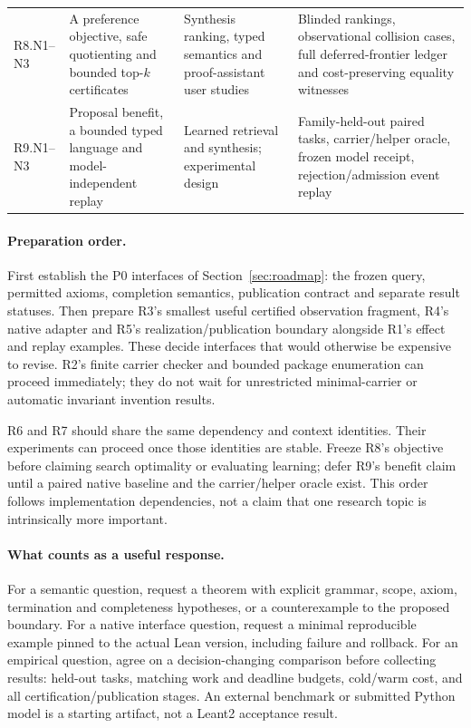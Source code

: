 \begin{longtable}{@{}L{17mm}L{43mm}L{42mm}L{44mm}@{}}
R8.N1--N3 & A preference objective, safe quotienting and bounded top-$k$ certificates & Synthesis ranking, typed semantics and proof-assistant user studies & Blinded rankings, observational collision cases, full deferred-frontier ledger and cost-preserving equality witnesses\\
R9.N1--N3 & Proposal benefit, a bounded typed language and model-independent replay & Learned retrieval and synthesis; experimental design & Family-held-out paired tasks, carrier/helper oracle, frozen model receipt, rejection/admission event replay\\
\bottomrule
\end{longtable}

\paragraph{Preparation order.}
First establish the P0 interfaces of Section~\ref{sec:roadmap}: the frozen
query, permitted axioms, completion semantics, publication contract and
separate result statuses. Then prepare R3's smallest useful certified
observation fragment, R4's native adapter and R5's realization/publication
boundary alongside R1's effect and replay examples. These decide interfaces
that would otherwise be expensive to revise. R2's finite carrier checker and
bounded package enumeration can proceed immediately; they do not wait for
unrestricted minimal-carrier or automatic invariant invention results.

R6 and R7 should share the same dependency and context identities. Their
experiments can proceed once those identities are stable. Freeze R8's
objective before claiming search optimality or evaluating learning; defer
R9's benefit claim until a paired native baseline and the carrier/helper
oracle exist. This order follows implementation dependencies, not a claim
that one research topic is intrinsically more important.

\paragraph{What counts as a useful response.}
For a semantic question, request a theorem with explicit grammar, scope,
axiom, termination and completeness hypotheses, or a counterexample to the
proposed boundary. For a native interface question, request a minimal
reproducible example pinned to the actual Lean version, including failure
and rollback. For an empirical question, agree on a decision-changing
comparison before collecting results: held-out tasks, matching work and
deadline budgets, cold/warm cost, and all certification/publication stages.
An external benchmark or submitted Python model is a starting artifact,
not a Leant2 acceptance result.

